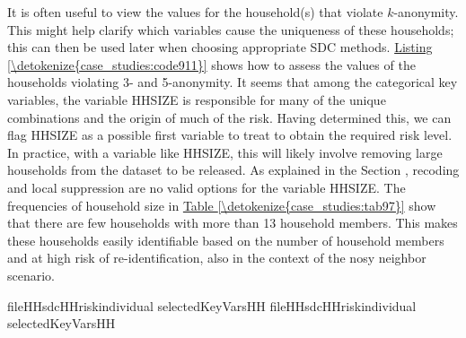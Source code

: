\documentclass[letterpaper,10pt,english]{sphinxmanual}
\begin{document}
It is often useful to view the values for the household(s) that violate
\(k\)-anonymity. This might help clarify which variables cause the
uniqueness of these households; this can then be used later when
choosing appropriate SDC methods. \hyperref[\detokenize{case_studies:code911}]{Listing \ref{\detokenize{case_studies:code911}}} shows how to assess the
values of the households violating 3- and 5-anonymity. It seems that
among the categorical key variables, the variable HHSIZE is responsible
for many of the unique combinations and the origin of much of the risk.
Having determined this, we can flag HHSIZE as a possible first variable
to treat to obtain the required risk level. In practice, with a variable
like HHSIZE, this will likely involve removing large households from the
dataset to be released. As explained in the Section
, recoding and local
suppression are no valid options for the variable HHSIZE. The
frequencies of household size in \hyperref[\detokenize{case_studies:tab97}]{Table \ref{\detokenize{case_studies:tab97}}} show that there
are few households with more than 13 household members. This makes these
households easily identifiable based on the number of household members
and at high risk of re-identification, also in the context of the nosy
neighbor scenario.

\def\sphinxLiteralBlockLabel{\label{\detokenize{case_studies:code911}}}
%
\begin{sphinxVerbatim}[commandchars=\\\{\},numbers=left,firstnumber=1,stepnumber=1]
fileHH\PYG{p}{[}sdcHHriskindividual\PYG{p}{[}\PYG{p}{]}   selectedKeyVarsHH\PYG{p}{]} 
fileHH\PYG{p}{[}sdcHHriskindividual\PYG{p}{[}\PYG{p}{]}   selectedKeyVarsHH\PYG{p}{]} 
\end{sphinxVerbatim}
\end{document}
